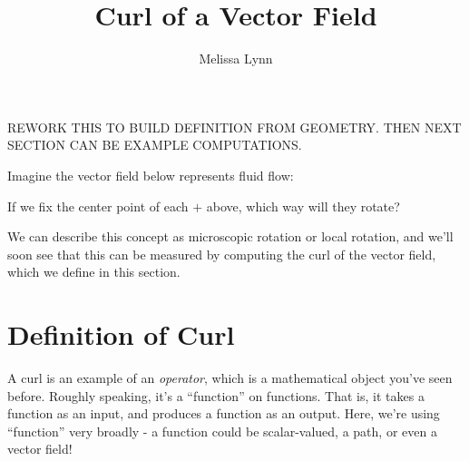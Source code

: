 \documentclass{ximera}
\title{Curl of a Vector Field}
\author{Melissa Lynn}
\begin{document}
  
\begin{abstract}  
\end{abstract}  
\maketitle 

REWORK THIS TO BUILD DEFINITION FROM GEOMETRY. THEN NEXT SECTION CAN BE EXAMPLE COMPUTATIONS.


Imagine the vector field below represents fluid flow:




If we fix the center point of each $+$ above, which way will they rotate? 

We can describe this concept as microscopic rotation or local rotation, and we'll soon see that this can be measured by computing the curl of the vector field, which we define in this section.

\section*{Definition of Curl}

A curl is an example of an \emph{operator}, which is a mathematical object you've seen before. Roughly speaking, it's a ``function'' on functions. That is, it takes a function as an input, and produces a function as an output. Here, we're using ``function'' very broadly - a function could be scalar-valued, a path, or even a vector field!
\end{document}
